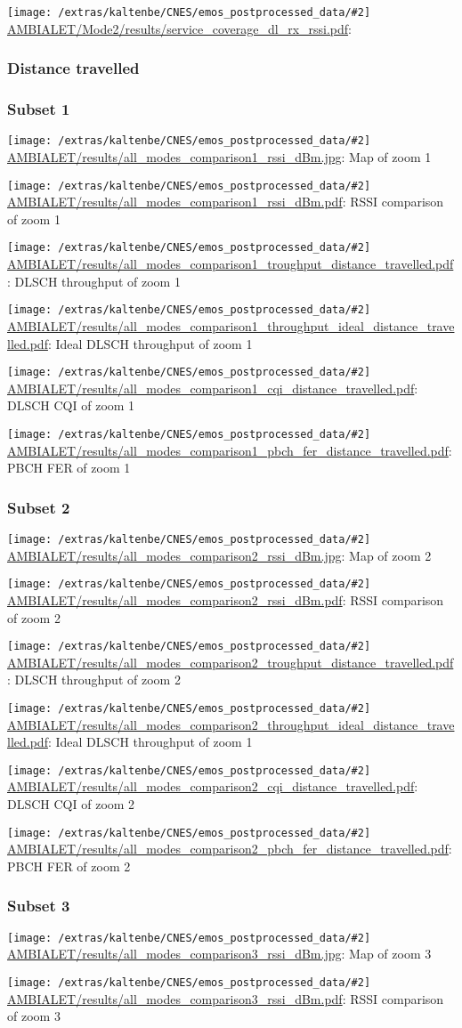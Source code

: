 \documentclass[a4paper,10pt]{article}
\newcommand{\printfile}[2][]{
 \begin{minipage}{8cm}
  \centering
  \texttt{[image: /extras/kaltenbe/CNES/emos\_postprocessed\_data/\#2]}
  \url{#2}: #1

 \end{minipage}
}
\begin{document}
\printfile{AMBIALET/Mode2/results/service_coverage_dl_rx_rssi.pdf}

\subsubsection{Distance travelled}
\label{sec:dist_travelled_ambialet}

\subsubsection*{Subset 1}

\printfile[Map of zoom 1]{AMBIALET/results/all_modes_comparison1_rssi_dBm.jpg}
\printfile[RSSI comparison of zoom 1]{AMBIALET/results/all_modes_comparison1_rssi_dBm.pdf}

\printfile[DLSCH throughput of zoom 1]{AMBIALET/results/all_modes_comparison1_troughput_distance_travelled.pdf}
\printfile[Ideal DLSCH throughput of zoom 1]{AMBIALET/results/all_modes_comparison1_throughput_ideal_distance_travelled.pdf}

\printfile[DLSCH CQI of zoom 1]{AMBIALET/results/all_modes_comparison1_cqi_distance_travelled.pdf}
\printfile[PBCH FER of zoom 1]{AMBIALET/results/all_modes_comparison1_pbch_fer_distance_travelled.pdf}

\subsubsection*{Subset 2}

\printfile[Map of zoom 2]{AMBIALET/results/all_modes_comparison2_rssi_dBm.jpg}
\printfile[RSSI comparison of zoom 2]{AMBIALET/results/all_modes_comparison2_rssi_dBm.pdf}

\printfile[DLSCH throughput of zoom 2]{AMBIALET/results/all_modes_comparison2_troughput_distance_travelled.pdf}
\printfile[Ideal DLSCH throughput of zoom 1]{AMBIALET/results/all_modes_comparison2_throughput_ideal_distance_travelled.pdf}

\printfile[DLSCH CQI of zoom 2]{AMBIALET/results/all_modes_comparison2_cqi_distance_travelled.pdf}
\printfile[PBCH FER of zoom 2]{AMBIALET/results/all_modes_comparison2_pbch_fer_distance_travelled.pdf}

\subsubsection*{Subset 3}

\printfile[Map of zoom 3]{AMBIALET/results/all_modes_comparison3_rssi_dBm.jpg}
\printfile[RSSI comparison of zoom 3]{AMBIALET/results/all_modes_comparison3_rssi_dBm.pdf}
\end{document}

